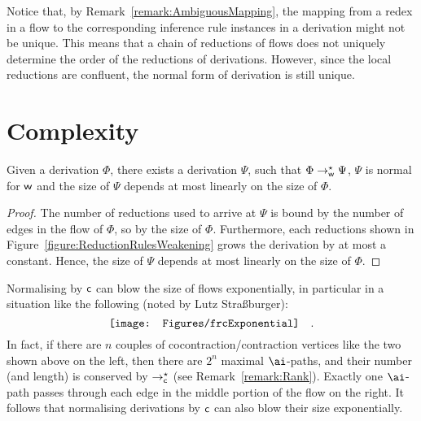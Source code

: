 \begin{remark}
Notice that, by Remark~\vref{remark:AmbiguousMapping}, the mapping from a redex in a flow to the corresponding inference rule instances in a derivation might not be unique. This means that a chain of reductions of flows does not uniquely determine the order of the reductions of derivations. However, since the local reductions are confluent, the normal form of derivation is still unique.
\end{remark}

\section{Complexity}\label{section:FlowRewriteComplexity}

\begin{proposition}\label{proposition:SizeWeakeningReduction}
Given a derivation $\Phi$, there exists a derivation $\Psi$, such that $\Phi\to_{\mathsf w}^\star\Psi$, $\Psi$ is normal for ${\mathsf w}$ and the size of $\Psi$ depends at most linearly on the size of $\Phi$.
\end{proposition}

\begin{proof}
The number of reductions used to arrive at $\Psi$ is bound by the number of edges in the flow of $\Phi$, so by the size of $\Phi$. Furthermore, each reductions shown in Figure~\vref{figure:ReductionRulesWeakening} grows the derivation by at most a constant. Hence, the size of $\Psi$ depends at most linearly on the size of $\Phi$.
\end{proof}

\begin{remark}\label{remark:RewriteContractionExponential}
Normalising by ${\mathsf c}$ can blow the size of flows exponentially, in particular in a situation like the following (noted by Lutz Stra{\ss}burger):
\[
\vcenter{\hbox{\texttt{[image: Figures/frcExponential]}}}
\quad.
\]
In fact, if there are $n$ couples of cocontraction/contraction vertices like the two shown above on the left, then there are $2^n$ maximal $\ai$-paths, and their number (and length) is conserved by $\to_{\mathsf c}^\star$ (see Remark~\vref{remark:Rank}). Exactly one $\ai$-path passes through each edge in the middle portion of the flow on the right. It follows that normalising derivations by ${\mathsf c}$ can also blow their size exponentially.
\end{remark}

